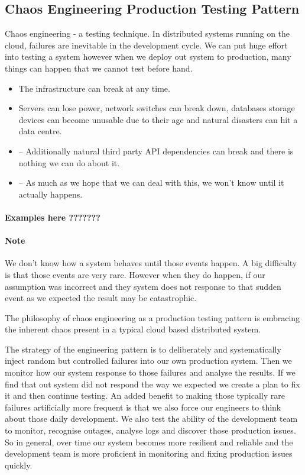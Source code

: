 \subsection{Chaos Engineering Production Testing Pattern}
Chaos engineering - a testing technique.
In distributed systems running on the cloud, failures are inevitable in the development cycle.
We can put huge effort into testing a system however when we deploy out system to production, many things can happen that we cannot test before hand.
\begin{itemize}
    \item The infrastructure can break at any time.
    \item Servers can lose power, network switches can break down, databases storage devices can become unusable due to their age and natural disasters can hit a data centre.
    \item -- Additionally natural third party API dependencies can break and there is nothing we can do about it.
    \item -- As much as we hope that we can deal with this, we won't know until it actually happens.
\end{itemize}

\paragraph{Examples here ???????}

\paragraph{Note}
We don't know how a system behaves until those events happen.
A big difficulty is that those events are very rare.
However when they do happen, if our assumption was incorrect and they system does not response to that sudden event as we expected the result may be catastrophic.

The philosophy of chaos engineering as a production testing pattern is embracing the inherent chaos present in a typical cloud based distributed system.

The strategy of the engineering pattern is to deliberately and systematically inject random but controlled failures into our own production system.
Then we monitor how our system response to those failures and analyse the results.
If we find that out system did not respond the way we expected we create a plan to fix it and then continue testing.
An added benefit to making those typically rare failures artificially more frequent is that we also force our engineers to think about those daily development.
We also test the ability of the development team to monitor, recognise outages, analyse logs and discover those production issues.
So in general, over time our system becomes more resilient and reliable and the development team is more proficient in monitoring and fixing production issues quickly.

